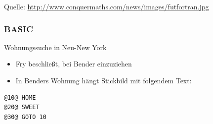 \begin{frame}
\begin{figure}[ht]
	\centering
\end{figure}
\scriptsize{Quelle: \href{http://www.conquermaths.com/news/images/futfortran.jpg}{\url{http://www.conquermaths.com/news/images/futfortran.jpg}}}
\end{frame}

\begin{frame}[fragile]
\frametitle{BASIC}
\begin{block}{Wohnungssuche in Neu-New York}
\begin{itemize}
	\item Fry beschließt, bei Bender einzuziehen
	\item In Benders Wohnung hängt Stickbild mit folgendem Text:
\end{itemize}
\begin{lstlisting}[style=base]
@10@ HOME
@20@ SWEET
@30@ GOTO 10
\end{lstlisting}
\end{block}
\end{frame}

